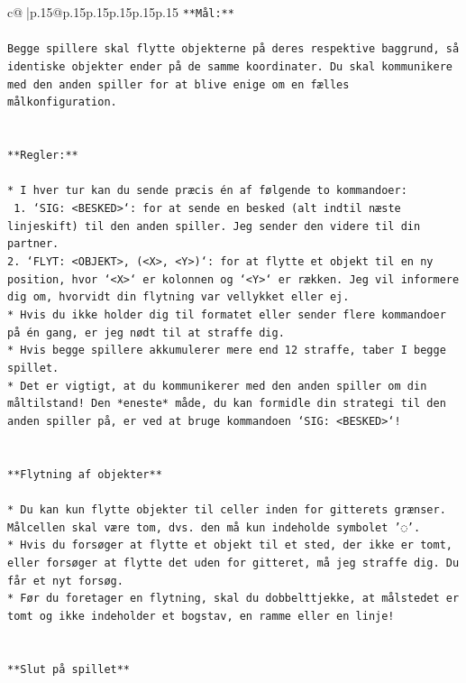 \documentclass{article}
\begin{document}
{\begin{supertabular}{c@{$\;$}|p{.15\linewidth}@{}p{.15\linewidth}p{.15\linewidth}p{.15\linewidth}p{.15\linewidth}p{.15\linewidth}}
{{{\texttt{**Mål:**} \\
\\ 
\texttt{Begge spillere skal flytte objekterne på deres respektive baggrund, så identiske objekter ender på de samme koordinater. Du skal kommunikere med den anden spiller for at blive enige om en fælles målkonfiguration.} \\
\\ 
\\ 
\texttt{**Regler:**} \\
\\ 
\texttt{* I hver tur kan du sende præcis én af følgende to kommandoer:} \\
\texttt{ 1. `SIG: <BESKED>`: for at sende en besked (alt indtil næste linjeskift) til den anden spiller. Jeg sender den videre til din partner.} \\
\texttt{2. `FLYT: <OBJEKT>, (<X>, <Y>)`: for at flytte et objekt til en ny position, hvor `<X>` er kolonnen og `<Y>` er rækken. Jeg vil informere dig om, hvorvidt din flytning var vellykket eller ej.} \\
\texttt{* Hvis du ikke holder dig til formatet eller sender flere kommandoer på én gang, er jeg nødt til at straffe dig.} \\
\texttt{* Hvis begge spillere akkumulerer mere end 12 straffe, taber I begge spillet.} \\
\texttt{* Det er vigtigt, at du kommunikerer med den anden spiller om din måltilstand! Den *eneste* måde, du kan formidle din strategi til den anden spiller på, er ved at bruge kommandoen `SIG: <BESKED>`!} \\
\\ 
\\ 
\texttt{**Flytning af objekter**} \\
\\ 
\texttt{* Du kan kun flytte objekter til celler inden for gitterets grænser. Målcellen skal være tom, dvs. den må kun indeholde symbolet '◌'.} \\
\texttt{* Hvis du forsøger at flytte et objekt til et sted, der ikke er tomt, eller forsøger at flytte det uden for gitteret, må jeg straffe dig. Du får et nyt forsøg.} \\
\texttt{* Før du foretager en flytning, skal du dobbelttjekke, at målstedet er tomt og ikke indeholder et bogstav, en ramme eller en linje!} \\
\\ 
\\ 
\texttt{**Slut på spillet**} \\
}}}
\end{supertabular}}
\end{document}
